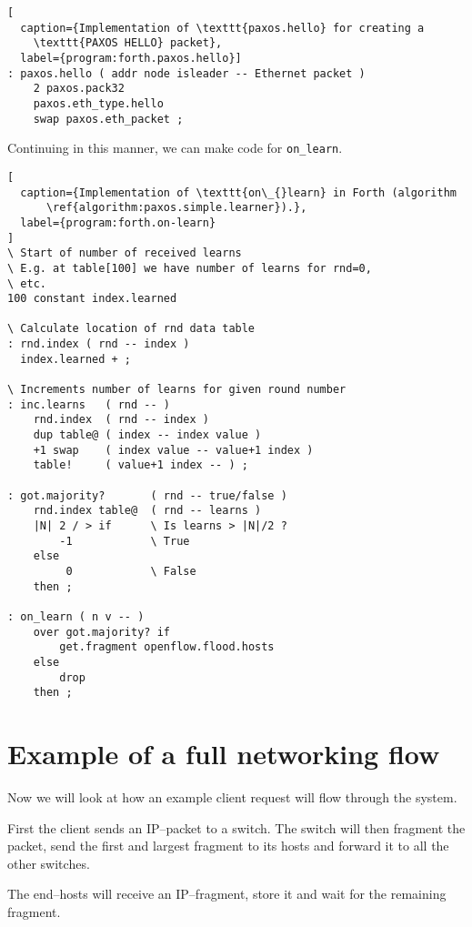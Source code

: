 \begin{lstlisting}[
  caption={Implementation of \texttt{paxos.hello} for creating a
    \texttt{PAXOS HELLO} packet},
  label={program:forth.paxos.hello}]
: paxos.hello ( addr node isleader -- Ethernet packet )
    2 paxos.pack32
    paxos.eth_type.hello
    swap paxos.eth_packet ;
\end{lstlisting}

Continuing in this manner, we can make code for \texttt{on\_{}learn}.

\begin{lstlisting}[
  caption={Implementation of \texttt{on\_{}learn} in Forth (algorithm
      \ref{algorithm:paxos.simple.learner}).},
  label={program:forth.on-learn}
]
\ Start of number of received learns
\ E.g. at table[100] we have number of learns for rnd=0,
\ etc.
100 constant index.learned

\ Calculate location of rnd data table
: rnd.index ( rnd -- index )
  index.learned + ;

\ Increments number of learns for given round number
: inc.learns   ( rnd -- )
    rnd.index  ( rnd -- index )
    dup table@ ( index -- index value )
    +1 swap    ( index value -- value+1 index )
    table!     ( value+1 index -- ) ;

: got.majority?       ( rnd -- true/false )
    rnd.index table@  ( rnd -- learns )
    |N| 2 / > if      \ Is learns > |N|/2 ?
        -1            \ True
    else
         0            \ False
    then ;

: on_learn ( n v -- )
    over got.majority? if
        get.fragment openflow.flood.hosts
    else
        drop
    then ;
\end{lstlisting}

\section{Example of a full networking flow}

Now we will look at how an example client request will flow through the
system.

First the client sends an IP--packet to a switch.
The switch will then fragment the packet, send the first and largest
fragment to its hosts and forward it to all the other switches.

The end--hosts will receive an IP--fragment, store it and wait for the
remaining fragment.


